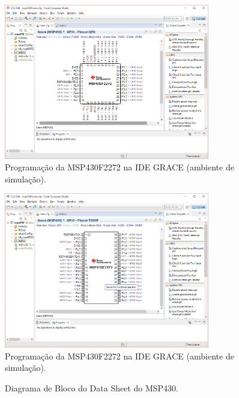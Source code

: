 \documentclass[
	12pt,				%
	openright,			%
  oneside,     %
	a4paper,			%
	english,			%
	french,				%
	spanish,			%
	brazil				%
	]{abntex2}
\begin{document}
\begin{figure}[ht]
  \centering
  \caption{\label{fig:APP-GRACE01}Programação da MSP430F2272 na IDE GRACE (ambiente de simulação).}
  \includegraphics[width=0.8\textwidth]{images/Atividade05/APP-GRACE01.png}
\end{figure}

\begin{figure}[ht]
  \centering
  \caption{\label{fig:APP-GRACE02}Programação da MSP430F2272 na IDE GRACE (ambiente de simulação).}
  \includegraphics[width=0.8\textwidth]{images/Atividade05/APP-GRACE02.png}
\end{figure}

\newpage
\begin{figure}[H]
  \centering
  
  \caption{\label{fig:cha-5-diagrama-bloco}Diagrama de Bloco do Data Sheet do MSP430.}  
\end{figure}
\end{document}
